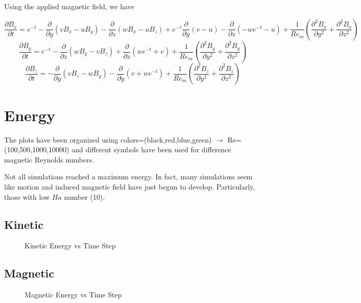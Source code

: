 \documentclass[11pt]{article}
\newcommand{\figS}{22.1em}
\newcommand{\figH}{\figS}
\newcommand{\figW}{\figS}
\begin{document}
Using the applied magnetic field, we have

\begin{equation}
	\frac{\partial B_x}{\partial t} 
	=
	e^{-t}
	- \frac{\partial}{\partial y} (v B_x - u B_y)
	- \frac{\partial}{\partial z} (w B_x - u B_z)
	+ e^{-t} \frac{\partial}{\partial y} (v - u)
	- \frac{\partial}{\partial z} (-w e^{-t} - u)	
	+
	\frac{1}{Re_m}
	\left(
	\frac{\partial^2 B_x}{\partial y^2}
	+ \frac{\partial^2 B_x}{\partial z^2}
	\right)
\end{equation}
\begin{equation}
	\frac{\partial B_y}{\partial t} 
	=
	e^{-t}
	- \frac{\partial}{\partial z} (w B_y - v B_z)
	+ \frac{\partial}{\partial z} (w e^{-t} + v)	
	+
	\frac{1}{Re_m}
	\left(
	\frac{\partial^2 B_y}{\partial y^2}
	+ \frac{\partial^2 B_y}{\partial z^2}
	\right)
\end{equation}
\begin{equation}
	\frac{\partial B_z}{\partial t} 
	=
	- \frac{\partial}{\partial y} (v B_z - w B_y)
	- \frac{\partial}{\partial y} (v + w e^{-t})
	+
	\frac{1}{Re_m}
	\left(
	\frac{\partial^2 B_z}{\partial y^2}
	+ \frac{\partial^2 B_z}{\partial z^2}
	\right)
\end{equation}

\section{Energy}
The plots have been organized using colors=(black,red,blue,green) $\rightarrow$ Re=(100,500,1000,10000) and different symbols have been used for difference magnetic Reynolds numbers.

Not all simulations reached a maximum energy. In fact, many simulations seem like motion and induced magnetic field have just begun to develop. Particularly, those with low $Ha$ number (10).

\subsection{Kinetic}
\begin{figure}[H]
 \centering
   \caption[Optional ]{Kinetic Energy vs Time Step}
\end{figure}

\subsection{Magnetic}
\begin{figure}[H]
 \centering 
   \caption[Optional ]{Magnetic Energy vs Time Step}
\end{figure}
\end{document}
